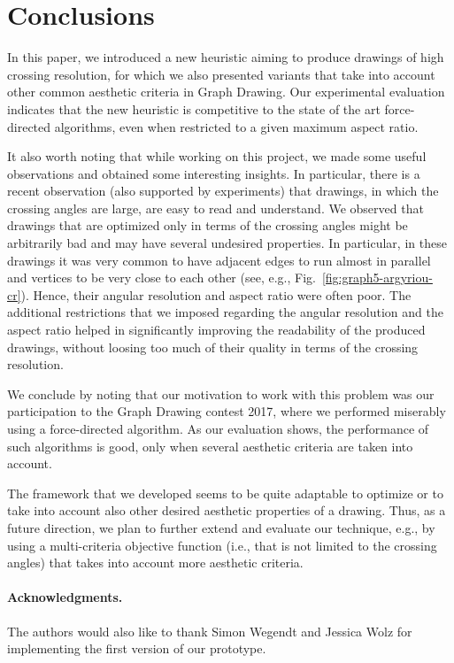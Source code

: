 \documentclass{comjnl}
\begin{document}
\section{Conclusions}
\label{sec:conclusions}

%
In this paper, we introduced a new heuristic aiming to produce drawings of high crossing resolution, for which we also presented variants that take into account other common aesthetic criteria in Graph Drawing. Our experimental evaluation indicates that the new heuristic is competitive to the state of the art force-directed algorithms, even when restricted to a given maximum aspect ratio. 

It also worth noting that while working on this project, we made some useful observations and obtained some interesting insights. In particular, there is a recent observation (also supported by experiments) that drawings, in which the crossing angles are large, are easy to read and understand. We observed that drawings that are optimized only in terms of the crossing angles might be arbitrarily bad and may have several undesired properties. In particular, in these drawings it was very common to have adjacent edges to run almost in parallel and vertices to be very close to each other (see, e.g., Fig.~\ref{fig:graph5-argyriou-cr}). Hence, their angular resolution and aspect ratio were often poor. The additional restrictions that we imposed regarding the angular resolution and the aspect ratio helped in significantly improving the readability of the produced drawings, without loosing too much of their quality in terms of the crossing resolution.

We conclude by noting that our motivation to work with this problem was our participation to the Graph Drawing contest 2017, where we performed miserably using a force-directed algorithm. As our evaluation shows, the performance of such algorithms is good, only when several aesthetic criteria are taken into account. 

The framework that we developed seems to be quite adaptable to optimize or to take into account also other desired aesthetic properties of a drawing. Thus, as a future direction, we plan to further extend and evaluate our technique, e.g., by using a multi-criteria objective function (i.e., that is not limited to the crossing angles) that takes into account more aesthetic criteria. 

\paragraph{Acknowledgments.} The authors would also like to thank Simon Wegendt and Jessica Wolz for implementing the first version of our prototype.
\end{document}
